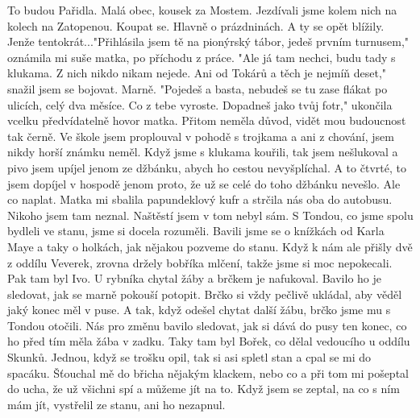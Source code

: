 

To budou Pařidla. Malá obec, kousek za Mostem. Jezdívali jsme kolem
nich na kolech na Zatopenou. Koupat se. Hlavně o prázdninách. A ty se
opět blížily. Jenže tentokrát..."Přihlásila jsem tě na pionýrský
tábor, jedeš prvním turnusem," oznámila mi suše matka, po příchodu z
práce. "Ale já tam nechci, budu tady s klukama. Z nich nikdo nikam
nejede. Ani od Tokárů a těch je nejmíň deset," snažil jsem se bojovat.
Marně. "Pojedeš a basta, nebudeš se tu zase flákat po ulicích, celý
dva měsíce. Co z tebe vyroste. Dopadneš jako tvůj fotr," ukončila
vcelku předvídatelně hovor matka. Přitom neměla důvod, vidět mou
budoucnost tak černě. Ve škole jsem proplouval v pohodě s trojkama a
ani z chování, jsem nikdy horší známku neměl. Když jsme s klukama
kouřili, tak jsem nešlukoval a pivo jsem upíjel jenom ze džbánku,
abych ho cestou nevyšplíchal. A to čtvrté, to jsem dopíjel v hospodě
jenom proto, že už se celé do toho džbánku nevešlo. Ale co naplat.
Matka mi sbalila papundeklový kufr a strčila nás oba do autobusu.
Nikoho jsem tam neznal. Naštěstí jsem v tom nebyl sám. S Tondou, co
jsme spolu bydleli ve stanu, jsme si docela rozuměli. Bavili jsme se o
knížkách od Karla Maye a taky o holkách, jak nějakou pozveme do stanu.
Když k nám ale přišly dvě z oddílu Veverek, zrovna držely bobříka
mlčení, takže jsme si moc nepokecali. Pak tam byl Ivo. U rybníka
chytal žáby a brčkem je nafukoval. Bavilo ho je sledovat, jak se marně
pokouší potopit. Brčko si vždy pečlivě ukládal, aby věděl jaký konec
měl v puse. A tak, když odešel chytat další žábu, brčko jsme mu s
Tondou otočili. Nás pro změnu bavilo sledovat, jak si dává do pusy ten
konec, co ho před tím měla žába v zadku. Taky tam byl Bořek, co dělal
vedoucího u oddílu Skunků. Jednou, když se trošku opil, tak si asi
spletl stan a cpal se mi do spacáku. Šťouchal mě do břicha nějakým
klackem, nebo co a při tom mi pošeptal do ucha, že už všichni spí a
můžeme jít na to. Když jsem se zeptal, na co s ním mám jít, vystřelil
ze stanu, ani ho nezapnul. 
